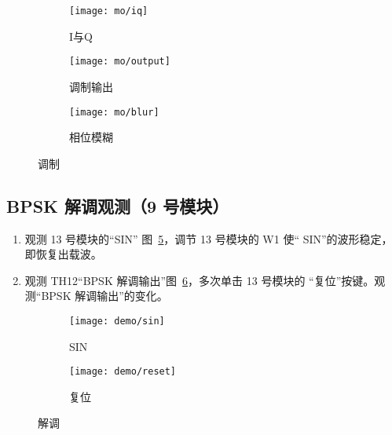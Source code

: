 \documentclass[../main]{subfiles}
\begin{document}
\begin{figure}[htbp]
  \centering
  \begin{subfigure}[htbp]{0.45\linewidth}
    \centering
    \texttt{[image: mo/iq]}
    \caption{I与Q}%
    \label{fig:mo/iq}
  \end{subfigure}
  \quad
  \begin{subfigure}[htbp]{0.45\linewidth}
    \centering
    \texttt{[image: mo/output]}
    \caption{调制输出}%
    \label{fig:mo/output}
  \end{subfigure}

  \begin{subfigure}[htbp]{0.45\linewidth}
    \centering
    \texttt{[image: mo/blur]}
    \caption{相位模糊}%
    \label{fig:mo/blur}
  \end{subfigure}
  \caption{调制}%
  \label{fig:mo}
\end{figure}

\subsection{BPSK 解调观测（9 号模块）}%
\label{sub:demodem}


\begin{enumerate}
  \item 观测 13 号模块的“SIN” 图~\ref{fig:demo/sin}，调节 13 号模块的 W1 使“
    SIN”的波形稳定，即恢复出载波。
  \item 观测 TH12“BPSK 解调输出”图~\ref{fig:demo/reset}，多次单击 13 号模块的
    “复位”按键。观测“BPSK 解调输出”的变化。
\end{enumerate}

\begin{figure}[htbp]
  \centering
  \begin{subfigure}[htbp]{0.45\linewidth}
    \centering
    \texttt{[image: demo/sin]}
    \caption{SIN}%
    \label{fig:demo/sin}
  \end{subfigure}
  \quad
  \begin{subfigure}[htbp]{0.45\linewidth}
    \centering
    \texttt{[image: demo/reset]}
    \caption{复位}%
    \label{fig:demo/reset}
  \end{subfigure}
  \caption{解调}%
  \label{fig:demo}
\end{figure}
\end{document}

